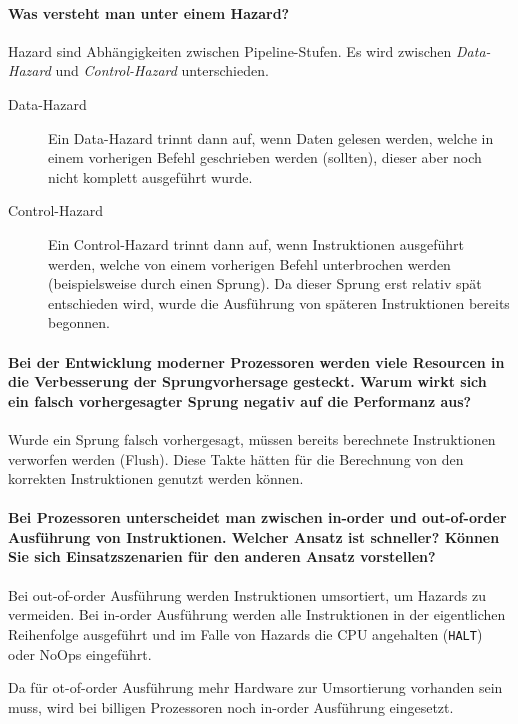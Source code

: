 \documentclass[a4paper, 11pt, accentcolor = tud3b]{tudreport}
\begin{document}
                \paragraph{Was versteht man unter einem Hazard?}
                    Hazard sind Abhängigkeiten zwischen Pipeline-Stufen. Es wird zwischen \textit{Data-Hazard} und \textit{Control-Hazard} unterschieden.
                    \begin{description}
                        \item[Data-Hazard] Ein Data-Hazard trinnt dann auf, wenn Daten gelesen werden, welche in einem vorherigen Befehl geschrieben werden (sollten), dieser aber noch nicht komplett ausgeführt wurde.
                        \item[Control-Hazard] Ein Control-Hazard trinnt dann auf, wenn Instruktionen ausgeführt werden, welche von einem vorherigen Befehl unterbrochen werden (beispielsweise durch einen Sprung). Da dieser Sprung erst relativ spät entschieden wird, wurde die Ausführung von späteren Instruktionen bereits begonnen.
                    \end{description}

                \paragraph{Bei der Entwicklung moderner Prozessoren werden viele Resourcen in die Verbesserung der Sprungvorhersage gesteckt. Warum wirkt sich ein falsch vorhergesagter Sprung negativ auf die Performanz aus?}
                    Wurde ein Sprung falsch vorhergesagt, müssen bereits berechnete Instruktionen verworfen werden (Flush). Diese Takte hätten für die Berechnung von den korrekten Instruktionen genutzt werden können.

                \paragraph{Bei Prozessoren unterscheidet man zwischen in-order und out-of-order Ausführung von Instruktionen. Welcher Ansatz ist schneller? Können Sie sich Einsatzszenarien für den anderen Ansatz vorstellen?}
                    Bei out-of-order Ausführung werden Instruktionen umsortiert, um Hazards zu vermeiden. Bei in-order Ausführung werden alle Instruktionen in der eigentlichen Reihenfolge ausgeführt und im Falle von Hazards die CPU angehalten (\texttt{HALT}) oder NoOps eingeführt.

                    Da für ot-of-order Ausführung mehr Hardware zur Umsortierung vorhanden sein muss, wird bei billigen Prozessoren noch in-order Ausführung eingesetzt.
\end{document}
